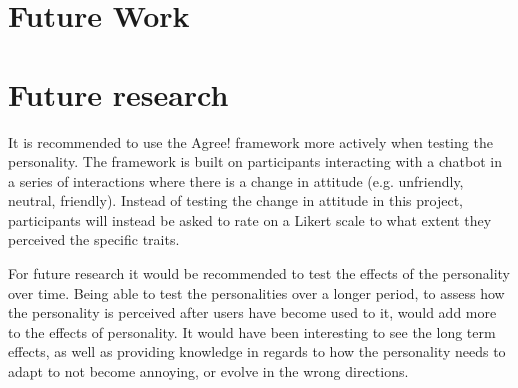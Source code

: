 \section{Future Work}
\label{sec:future}
\section{Future research}

It is recommended to use the Agree! framework \citep{Callejas2014} more actively when testing the personality. The framework is built on participants interacting with a chatbot in a series of interactions where there is a change in attitude (e.g. unfriendly, neutral, friendly). Instead of testing the change in attitude in this project, participants will instead be asked to rate on a Likert scale to what extent they perceived the specific traits.

For future research it would be recommended to test the effects of the personality over time. Being able to test the personalities over a longer period, to assess how the personality is perceived after users have become used to it, would add more to the effects of personality. It would have been interesting to see the long term effects, as well as providing knowledge in regards to how the personality needs to adapt to not become annoying, or evolve in the wrong directions.
